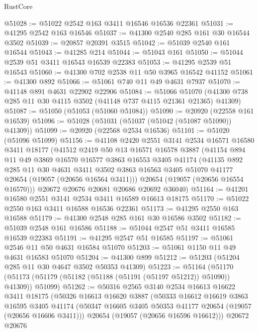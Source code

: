 \begin{lexlean}{RustCore}
\begin{coremodule}
@51028 := @51022 @2542 @163 @3411 @16546 @16536 @22361
@51031 := @41295 @2542 @163 @16546
@51037 := @41300 @2540 @285 @161 @30 @16544 @3502
@51039 := @20857 @20391 @3515
@51042 := @51039 @2540 @161 @16544
@51043 := @41285 @214
@51044 := @51043 @161
@51050 := @51044 @2539 @51 @3411 @16543 @16539 @22383
@51053 := @41295 @2539 @51 @16543
@51060 := @41300 @702 @2538 @11 @50 @3965 @16542 @41152
@51061 := @41300 @892
@51066 := @51061 @740 @11 @49 @4631 @7937
@51070 := @41148 @891 @4631 @22902 @22906
@51084 := @51066
    @51070
    (@41300 @738 @285 @11 @30 @4115 @3502 (@41148 @737 @4115 @21361 @21365) @41309)
@51087 := @51050 (@51053 (@51060 @51084))
@51090 := @20920 (@22558 @161 @16539)
@51096 := @51028 (@51031 (@51037 (@51042 (@51087 @51090)) @41309))
@51099 := @20920 (@22568 @2534 @16536)
@51101 := @51020 (@51096 @51099)
@51156 := @41108
    @2420
    @2551
    @3141
    @2534
    @16571
    @16580
    @3411
    @18177
    (@41512
      @2419
      @50
      @13
      @16571
      @16578
      @3887
      (@41154
        @894
        @11
        @49
        @3869
        @16570
        @16577
        @3863
        @16553
        @3405
        @41174
        (@41135
          @892
          @285
          @11
          @30
          @4631
          @3411
          @3502
          @3863
          @16563
          @3405
          @51070
          @41177
          @20654
          (@19057 (@20656 @16564 @3411)))
        @20654
        (@19057 (@20656 @16554 @16570)))
      @20672
      @20676
      @20681
      @20686
      @20692
      @36040)
@51164 := @41201 @16580 @2551 @3141 @2534 @3411 @16589 @16613 @18175
@51170 := @51022 @2550 @163 @3411 @16588 @16536 @22361
@51173 := @41295 @2550 @163 @16588
@51179 := @41300 @2548 @285 @161 @30 @16586 @3502
@51182 := @51039 @2548 @161 @16586
@51188 := @51044 @2547 @51 @3411 @16585 @16539 @22383
@51191 := @41295 @2547 @51 @16585
@51197 := @51061 @2546 @11 @50 @4631 @16584 @51070
@51203 := @51061 @1150 @11 @49 @4631 @16583 @51070
@51204 := @41300 @899
@51212 := @51203 (@51204 @285 @11 @30 @4647 @3502 @50353 @41309)
@51223 := @51164
    (@51170 (@51173 (@51179 (@51182 (@51188 (@51191 (@51197 @51212)) @51090)) @41309)) @51099)
@51262 := @50316
    @2565
    @3140
    @2534
    @16613
    @16622
    @3411
    @18175
    (@50326
      @16613
      @16620
      @3887
      (@50333
        @16612
        @16619
        @3863
        @16595
        @3405
        @41174
        (@50347 @16605 @3405 @50353 @41177 @20654 (@19057 (@20656 @16606 @3411)))
        @20654
        (@19057 (@20656 @16596 @16612)))
      @20672
      @20676

\end{coremodule}
\end{lexlean}

